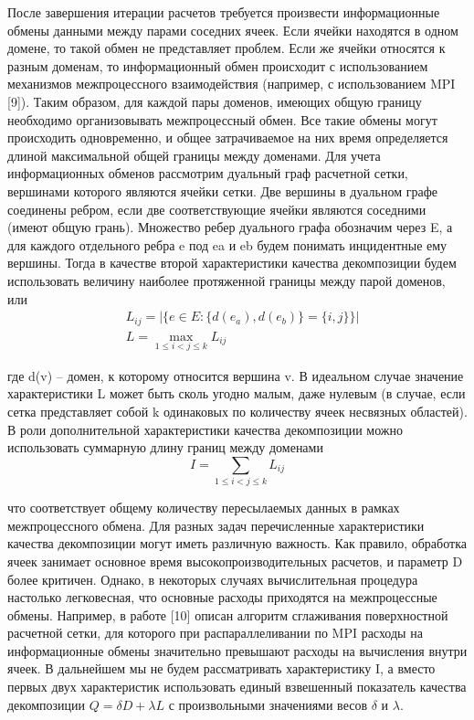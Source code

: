 После завершения итерации расчетов требуется произвести информационные обмены данными между парами соседних ячеек.
Если ячейки находятся в одном домене, то такой обмен не представляет проблем.
Если же ячейки относятся к разным доменам, то информационный обмен происходит с использованием механизмов межпроцессного взаимодействия (например, с использованием MPI [9]).
Таким образом, для каждой пары доменов, имеющих общую границу необходимо организовывать межпроцессный обмен.
Все такие обмены могут происходить одновременно, и общее затрачиваемое на них время определяется длиной максимальной общей границы между доменами.
Для учета информационных обменов рассмотрим дуальный граф расчетной сетки, вершинами которого являются ячейки сетки.
Две вершины в дуальном графе соединены ребром, если две соответствующие ячейки являются соседними (имеют общую грань).
Множество ребер дуального графа обозначим через E, а для каждого отдельного ребра e под ea и eb будем понимать инцидентные ему вершины.
Тогда в качестве второй характеристики качества декомпозиции будем использовать величину наиболее протяженной границы между парой доменов, или
\begin{equation}
	\begin{aligned}
		& L_{ij} = \left| \{ e \in E: \{ d(e_a), d(e_b) \} = \{ i, j \} \} \right| \\
		& L = \max_{1 \le i < j \le k}{L_{ij}}
	\end{aligned}
\end{equation}

где d(v) – домен, к которому относится вершина v.
В идеальном случае значение характеристики L может быть сколь угодно малым, даже нулевым (в случае, если сетка представляет собой k одинаковых по количеству ячеек несвязных областей).
В роли дополнительной характеристики качества декомпозиции можно использовать суммарную длину границ между доменами
\begin{equation}
	I = \sum_{1 \le i < j \le k}{L_{ij}}
\end{equation}

что соответствует общему количеству пересылаемых данных в рамках межпроцессного обмена.
Для разных задач перечисленные характеристики качества декомпозиции могут иметь различную важность.
Как правило, обработка ячеек занимает основное время высокопроизводительных расчетов, и параметр D более критичен.
Однако, в некоторых случаях вычислительная процедура настолько легковесная, что основные расходы приходятся на межпроцессные обмены.
Например, в работе [10] описан алгоритм сглаживания поверхностной расчетной сетки, для которого при распараллеливании по MPI расходы на информационные обмены значительно превышают расходы на вычисления внутри ячеек. В дальнейшем мы не будем рассматривать характеристику I, а вместо первых двух характеристик использовать единый взвешенный показатель качества декомпозиции $Q = \delta D + \lambda L$ с произвольными значениями весов $\delta$ и $\lambda$.
